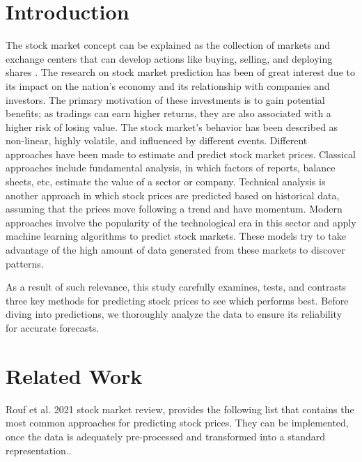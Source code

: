 \documentclass[conference]{IEEEtran}
\begin{document}
\section{Introduction}
The stock market concept can be explained as the collection of markets and exchange centers that can develop actions like buying, selling, and deploying shares \cite{Mukherjee2021}. The research on stock market prediction has been of great interest due to its impact on the nation's economy and its relationship with companies and investors.\cite{Rouf2021}
The primary motivation of these investments is to gain potential benefits; as tradings can earn higher returns, they are also associated with a higher risk of losing value. The stock market's behavior has been described as non-linear, highly volatile, and influenced by different events\cite{Thakkar2021}. Different approaches have been made to estimate and predict stock market prices. Classical approaches include fundamental analysis, in which factors of reports, balance sheets, etc, estimate the value of a sector or company. Technical analysis is another approach in which stock prices are predicted based on historical data, assuming that the prices move following a trend and have momentum. Modern approaches involve the popularity of the technological era in this sector and apply machine learning algorithms to predict stock markets. These models try to take advantage of the high amount of data generated from these markets to discover patterns\cite {Rouf2021}. 

As a result of such relevance, this study carefully examines, tests, and contrasts three key methods for predicting stock prices to see which performs best. Before diving into predictions, we thoroughly analyze the data to ensure its reliability for accurate forecasts.

\section{Related Work}

Rouf et al. 2021 stock market review, provides the following list that contains the most common approaches for predicting stock prices. They can be implemented, once the data is adequately pre-processed and transformed into a standard representation.\cite{Mukherjee2021}.
\end{document}
